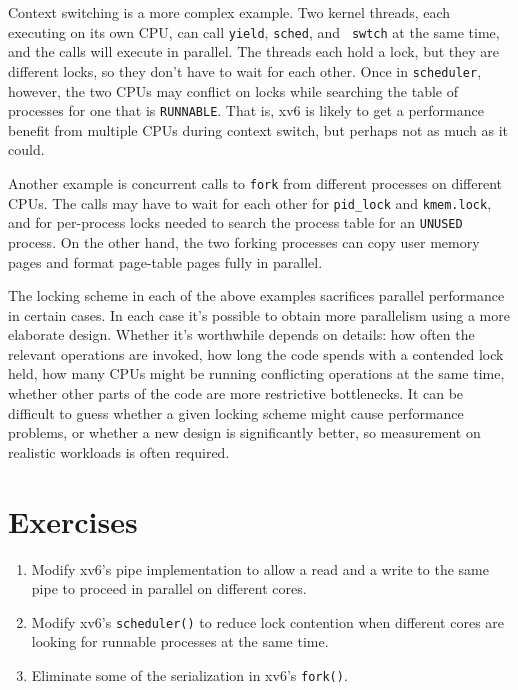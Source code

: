 Context switching is a more complex example. Two kernel threads, each
executing on its own CPU, can call {\tt yield}, {\tt sched}, and {\tt
  swtch} at the same time, and the calls will execute in parallel. The
threads each hold a lock, but they are different locks, so they don't
have to wait for each other. Once in {\tt scheduler}, however, the two
CPUs may conflict on locks while searching the table of processes for
one that is {\tt RUNNABLE}. That is, xv6 is likely to get a
performance benefit from multiple CPUs during context switch, but
perhaps not as much as it could.

Another example is concurrent calls to {\tt fork} from different
processes on different CPUs. The calls may have to wait for each other
for {\tt pid\_lock} and {\tt kmem.lock}, and for per-process locks
needed to search the process table for an {\tt UNUSED} process. On the
other hand, the two forking processes can copy user memory pages and
format page-table pages fully in parallel.

The locking scheme in each of the above examples sacrifices parallel
performance in certain cases. In each case it's possible to obtain
more parallelism using a more elaborate design. Whether it's
worthwhile depends on details: how often the relevant operations are
invoked, how long the code spends with a contended lock held, how many
CPUs might be running conflicting operations at the same time, whether
other parts of the code are more restrictive bottlenecks. It can be
difficult to guess whether a given locking scheme might cause
performance problems, or whether a new design is significantly better,
so measurement on realistic workloads is often required.

\section{Exercises}

\begin{enumerate}

\item Modify xv6's pipe implementation to allow a read and
  a write to the same pipe to proceed in parallel on different cores.

\item Modify xv6's \texttt{scheduler()} to reduce lock contention
  when different cores are looking for runnable processes at the same time.

\item Eliminate some of the serialization in xv6's \texttt{fork()}.

\end{enumerate}
